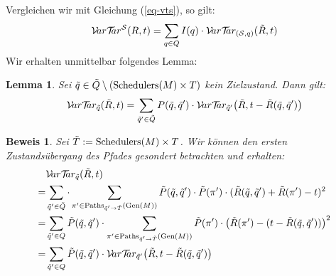 \documentclass[a4paper]{article}
\newtheorem{lemma}[satz]{Lemma}
\theoremstyle{nonumberplain}
\newtheorem{beweis}{Beweis}
\begin{document}
Vergleichen wir mit Gleichung (\ref{eq-vts}), so gilt:
\begin{equation}
\mathcal{V}\!ar \mathcal{T}\!\!ar^{\mathcal{S}}(R,t) = \sum_{q \in Q}{I(q)} \cdot \mathcal{V}\!ar \mathcal{T}\!\!ar_{(\mathcal{S},q)}(\tilde{R},t)
\end{equation}
Wir erhalten unmittelbar folgendes Lemma:
\begin{lemma}\label{lem-vt-conditioning}
	Sei $\tilde{q} \in \tilde{Q} \setminus (\mathrm{Schedulers}(M)\times T)$ kein Zielzustand. Dann gilt:
	\begin{equation}
	\mathcal{V}\!ar \mathcal{T}\!\!ar_{\tilde{q}}(\tilde{R},t) = \sum_{\tilde{q}' \in \tilde{Q}} P(\tilde{q},\tilde{q}') \cdot \mathcal{V}\!ar \mathcal{T}\!\!ar_{\tilde{q}'}\big(\tilde{R},t -\tilde{R}(\tilde{q},\tilde{q}')\big)
	\end{equation}
\end{lemma}
\begin{beweis}
Sei $\tilde{T} := \mathrm{Schedulers}(M)\times T$. Wir können den ersten Zustandsübergang des Pfades gesondert betrachten und erhalten:
\begin{align*}
&\mathcal{V}\!ar \mathcal{T}\!\!ar_{\tilde{q}}(\tilde{R},t)\\
=& \sum_{\tilde{q}' \in \tilde{Q}} \cdot \sum_{\pi' \in \mathrm{Paths}_{\tilde{q}' \rightarrow \tilde{T}}(\mathrm{Gen}(M))}{\tilde{P}(\tilde{q},\tilde{q}') \cdot \tilde{P}(\pi') \cdot (\tilde{R}(\tilde{q},\tilde{q}') + \tilde{R}(\pi') - t)^2}\\
=& \sum_{\tilde{q}' \in Q} \tilde{P}(\tilde{q},\tilde{q}') \cdot \sum_{\pi' \in \mathrm{Paths}_{\tilde{q}' \rightarrow \tilde{T}}(\mathrm{Gen}(M))}{\tilde{P}(\pi') \cdot \big(\tilde{R}(\pi') - (t- \tilde{R}(\tilde{q},\tilde{q}'))\big)^2}\\
=& \sum_{\tilde{q}' \in Q} \tilde{P}(\tilde{q},\tilde{q}') \cdot \mathcal{V}\!ar \mathcal{T}\!\!ar_{\tilde{q}'}\big(\tilde{R},t -\tilde{R}(\tilde{q},\tilde{q}')\big)
\end{align*}
\end{beweis}
\end{document}
